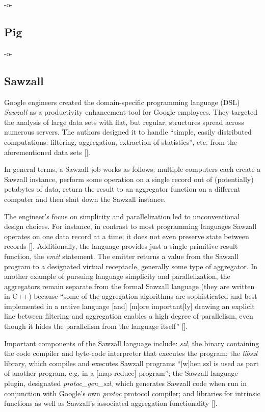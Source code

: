      -o-

\subsection{Pig}

-o- 

\subsection{Sawzall}

Google engineers created the domain-specific programming language
(DSL) \textit{Sawzall} as a productivity enhancement tool for Google
employees.  They targeted the analysis of large data sets with flat,
but regular, structures spread across numerous servers.  The authors
designed it to handle ``simple, easily distributed computations:
filtering, aggregation, extraction of statistics'', etc. from the
aforementioned data sets [\cite{pike05sawzall}].

In general terms, a Sawzall job works as follows: multiple computers
each create a Sawzall instance, perform some operation on a single
record out of (potentially) petabytes of data, return the result to an
aggregator function on a different computer and then shut down the
Sawzall instance.

The engineer's focus on simplicity and parallelization led to
unconventional design choices.  For instance, in contrast to most
programming languages Sawzall operates on one data record at a time;
it does not even preserve state between records
[\cite{www-bytemining-sawzall}]. Additionally, the language provides
just a single primitive result function, the \textit{emit} statement.
The emitter returns a value from the Sawzall program to a designated
virtual receptacle, generally some type of aggregator.  In another
example of pursuing language simplicity and parallelization, the
aggregators remain separate from the formal Sawzall language (they are
written in C++) because ``some of the aggregation algorithms are
sophisticated and best implemented in a native language [and] [m]ore
important[ly] drawing an explicit line between filtering and
aggregation enables a high degree of parallelism, even though it hides
the parallelism from the language itself'' [\cite{pike05sawzall}].

Important components of the Sawzall language include: \textit{szl},
the binary containing the code compiler and byte-code interpreter that
executes the program; the \textit{libszl} library, which compiles and
executes Sawzall programs ``[w]hen szl is used as part of another
program, e.g. in a [map-reduce] program''; the Sawzall language
plugin, designated \textit{protoc\_gen\_szl}, which generates Sawzall
code when run in conjunction with Google's own \textit{protoc}
protocol compiler; and libraries for intrinsic functions as well as
Sawzall's associated aggregation functionality
[\cite{www-google-code-wiki-sawzall}].

